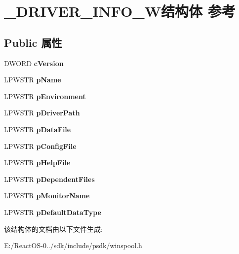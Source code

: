 \hypertarget{struct___d_r_i_v_e_r___i_n_f_o__3_w}{}\section{\+\_\+\+D\+R\+I\+V\+E\+R\+\_\+\+I\+N\+F\+O\+\_\+W结构体 参考}
\label{struct___d_r_i_v_e_r___i_n_f_o__3_w}
\subsection*{Public 属性}
\begin{DoxyCompactItemize}
\item 
\mbox{\label{struct___d_r_i_v_e_r___i_n_f_o__3_w_ac3776903e787440cc1564e12d41174c1}} 
D\+W\+O\+RD {\bfseries c\+Version}
\item 
\mbox{\label{struct___d_r_i_v_e_r___i_n_f_o__3_w_ac6f9fb42ae198f2f9af25652447875d5}} 
L\+P\+W\+S\+TR {\bfseries p\+Name}
\item 
\mbox{\label{struct___d_r_i_v_e_r___i_n_f_o__3_w_a374009f1e18dd71b1227755a57c963ae}} 
L\+P\+W\+S\+TR {\bfseries p\+Environment}
\item 
\mbox{\label{struct___d_r_i_v_e_r___i_n_f_o__3_w_acc9854561cb2002e45f003181760c193}} 
L\+P\+W\+S\+TR {\bfseries p\+Driver\+Path}
\item 
\mbox{\label{struct___d_r_i_v_e_r___i_n_f_o__3_w_a02af87d590f4e53b06708e1d47b62758}} 
L\+P\+W\+S\+TR {\bfseries p\+Data\+File}
\item 
\mbox{\label{struct___d_r_i_v_e_r___i_n_f_o__3_w_af0f77832b6e5c12f815c5a2b3d7b40b2}} 
L\+P\+W\+S\+TR {\bfseries p\+Config\+File}
\item 
\mbox{\label{struct___d_r_i_v_e_r___i_n_f_o__3_w_a5b35606ab00aaa78a1761b5b4d5cb970}} 
L\+P\+W\+S\+TR {\bfseries p\+Help\+File}
\item 
\mbox{\label{struct___d_r_i_v_e_r___i_n_f_o__3_w_acca263d2ddc81c3237cf281392749bad}} 
L\+P\+W\+S\+TR {\bfseries p\+Dependent\+Files}
\item 
\mbox{\label{struct___d_r_i_v_e_r___i_n_f_o__3_w_a518a10702bdbabb2d7db73de26af98ae}} 
L\+P\+W\+S\+TR {\bfseries p\+Monitor\+Name}
\item 
\mbox{\label{struct___d_r_i_v_e_r___i_n_f_o__3_w_afd4f726973736970035db6c902e69c28}} 
L\+P\+W\+S\+TR {\bfseries p\+Default\+Data\+Type}
\end{DoxyCompactItemize}


该结构体的文档由以下文件生成\+:\begin{DoxyCompactItemize}
\item 
E\+:/\+React\+O\+S-\/0../sdk/include/psdk/winspool.\+h\end{DoxyCompactItemize}
